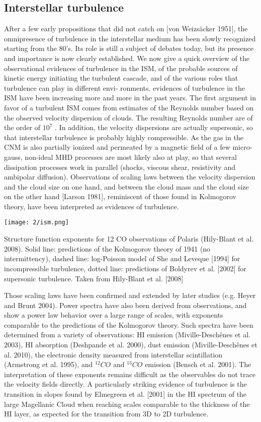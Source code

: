 \subsection{Interstellar turbulence}
After a few early propositions that did not catch on [von Weizsäcker 1951],
the omnipresence of turbulence in the interstellar medium has been slowly
recognized starting from the 80’s. Its role is still a subject of debates today,
but its presence and importance is now clearly established.
We now give a quick overview of the observational evidences of turbulence
in the ISM, of the probable sources of kinetic energy initiating the turbulent
cascade, and of the various roles that turbulence can play in different envi-
ronments.
 evidences of turbulence in the ISM have been increasing more and more in the past years. 
The first argument in favor of a turbulent ISM comes from estimates of the
Reynolds number based on the observed velocity dispersion of clouds. The
resulting Reynolds number are of the order of $10^7$ . In addition, the velocity
dispersions are actually supersonic, so that interstellar turbulence is probably highly compressible. As the gas in the CNM is also partially ionized and
permeated by a magnetic field of a few micro-gauss, non-ideal MHD processes are most likely also at play, so that several dissipation processes work
in parallel (shocks, viscous shear, resistivity and ambipolar diffusion).
Observations of scaling laws between the velocity dispersion and the cloud
size on one hand, and between the cloud mass and the cloud size on the other
hand [Larson 1981], reminiscent of those found in Kolmogorov theory, have been interpreted as evidences of turbulence. 
\begin{marginfigure}
\texttt{[image: 2/ism.png]}
\caption{Structure function exponents for 12 CO observations of Polaris (Hily-Blant
et al. 2008). Solid line: predictions of the Kolmogorov theory of 1941
(no intermittency), dashed line: log-Poisson model of She and Leveque
[1994] for incompressible turbulence, dotted line: predictions of Boldyrev
et al. [2002] for supersonic turbulence. Taken from Hily-Blant et al.
[2008]}
\label{fig:2-ismturbulence}
\end{marginfigure}
Those scaling laws have been confirmed and extended by later studies (e.g. Heyer and Brunt 2004). Power spectra have also been derived from observations, and show a power
law behavior over a large range of scales, with exponents comparable to the
predictions of the Kolmogorov theory. Such spectra have been determined
from a variety of observations: HI emission (Miville-Deschênes et al. 2003),
HI absorption (Deshpande et al. 2000), dust emission (Miville-Deschênes et al.
2010), the electronic density measured from interstellar scintillation (Armstrong et al. 1995), and $^{12}CO$ and $^{13}CO$ emission (Bensch et al. 2001). The
interpretation of these exponents remains difficult as the observables do not
trace the velocity fields directly. A particularly striking evidence of turbulence is the transition in slopes found by Elmegreen et al. [2001] in the HI
spectrum of the large Magellanic Cloud when reaching scales comparable to
the thickness of the HI layer, as expected for the transition from 3D to 2D
turbulence. 

